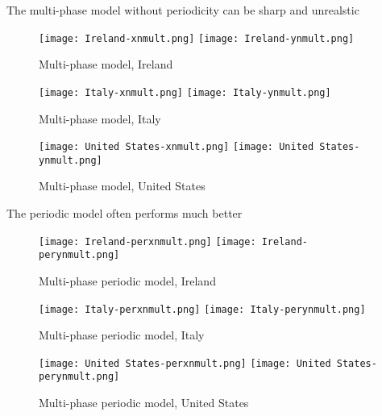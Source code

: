 The multi-phase model without periodicity can be sharp and unrealstic

\begin{figure}[H]
  \texttt{[image: Ireland-xnmult.png]} \label{fig:ireland-xnmult}
\endminipage\hfill
{}
  \texttt{[image: Ireland-ynmult.png]} \label{fig:ireland-ynmult}
\endminipage
\caption{Multi-phase model, Ireland}
\end{figure}

\begin{figure}[H]
  \texttt{[image: Italy-xnmult.png]} \label{fig:italy-xnmult}
\endminipage\hfill
{}
  \texttt{[image: Italy-ynmult.png]} \label{fig:italy-ynmult}
\endminipage
\caption{Multi-phase model, Italy}
\end{figure}

\begin{figure}[H]
  \texttt{[image: United States-xnmult.png]} \label{fig:usa-xnmult}
\endminipage\hfill
{}
  \texttt{[image: United States-ynmult.png]} \label{fig:usa-ynmult}
\endminipage
\caption{Multi-phase model, United States}
\end{figure}

The periodic model often performs much better

\begin{figure}[H]
  \texttt{[image: Ireland-perxnmult.png]} \label{fig:ireland-perxnmult}
\endminipage\hfill
{}
  \texttt{[image: Ireland-perynmult.png]} \label{fig:ireland-perynmult}
\endminipage
\caption{Multi-phase periodic model, Ireland}
\end{figure}

\begin{figure}[H]
  \texttt{[image: Italy-perxnmult.png]} \label{fig:italy-perxnmult}
\endminipage\hfill
{}
  \texttt{[image: Italy-perynmult.png]} \label{fig:italy-perynmult}
\endminipage
\caption{Multi-phase periodic model, Italy}
\end{figure}

\begin{figure}[H]
  \texttt{[image: United States-perxnmult.png]} \label{fig:usa-perxnmult}
\endminipage\hfill
{}
  \texttt{[image: United States-perynmult.png]} \label{fig:usa-perynmult}
\endminipage
\caption{Multi-phase periodic model, United States}
\end{figure}

